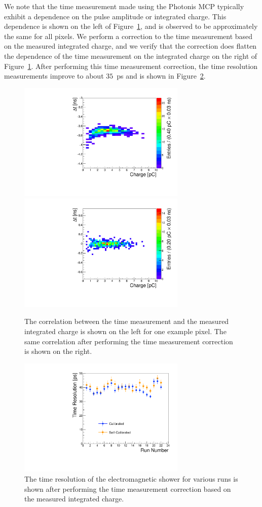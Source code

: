 \documentclass[12pt]{article}
\begin{document}
{We note that the time measurement made using the Photonis MCP typically exhibit
a dependence on the pulse amplitude or integrated charge. This dependence is
shown on the left of Figure~\ref{fig:dt-int}, and is observed to be 
approximately the same for all pixels. We perform a correction to the
time measurement based on the measured integrated charge, and we verify that the
correction does flatten the dependence of the time measurement on the integrated
charge on the right of Figure~\ref{fig:dt-int}. After performing this time 
measurement correction, the time resolution measurements improve to about 
$35$~ps and is shown in Figure~\ref{fig:calib}.

\begin{figure}[htbp]
	\centering
	\includegraphics[width=8cm]{Images/dt-int/dtint30_o22.pdf}
	\includegraphics[width=8cm]{Images/dt-int/dtint30_c22.pdf}
	\caption{The correlation between the time measurement and the measured
integrated charge is shown on the left for one example pixel. The same
correlation after performing the time measurement correction is shown on the 
right.
}
	\label{fig:dt-int}
\end{figure}

\begin{figure}[htbp]
	\centering
	\includegraphics[width=8cm]{Images/calibtres/timerescalib.pdf}
	\caption{ The time resolution of the electromagnetic shower for various runs is
shown after performing the time measurement correction based on the measured
integrated charge. }
	\label{fig:calib}
\end{figure}


}
\end{document}
